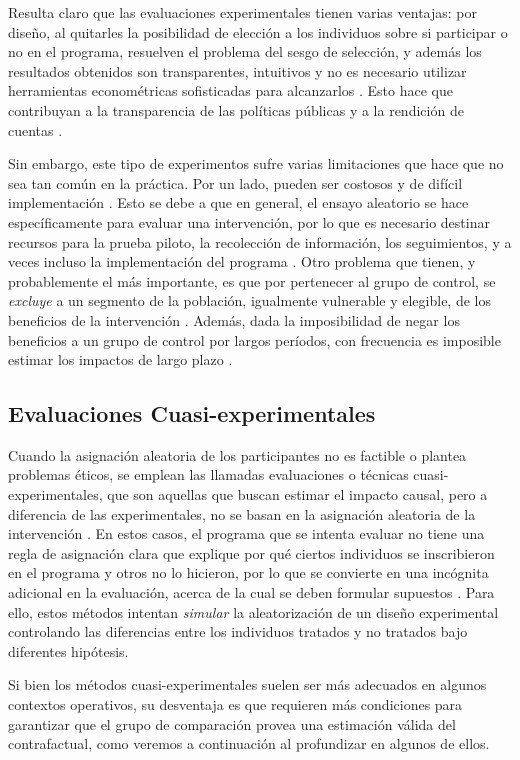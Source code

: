 \documentclass[../../main.tex]{subfiles}
\begin{document}
Resulta claro que las evaluaciones experimentales tienen varias ventajas: por diseño, al
quitarles la posibilidad de elección a los individuos sobre si participar o no en el
programa, resuelven el problema del sesgo de selección, y además los resultados obtenidos
son transparentes, intuitivos y no es necesario utilizar herramientas econométricas
sofisticadas para alcanzarlos \cite{bernal}. Esto hace que contribuyan a la transparencia
de las políticas públicas y a la rendición de cuentas \cite{bernal}.

Sin embargo, este tipo de experimentos sufre varias limitaciones que hace que no sea tan
común en la práctica. Por un lado, pueden ser costosos y de difícil implementación
\cite{bernal}. Esto se debe a que en general, el ensayo aleatorio se hace específicamente
para evaluar una intervención, por lo que es necesario destinar recursos para la prueba
piloto, la recolección de información, los seguimientos, y a veces incluso la
implementación del programa \cite{bernal}. Otro problema que tienen, y probablemente el
más importante, es que por pertenecer al grupo de control, se \textit{excluye} a un
segmento de la población, igualmente vulnerable y elegible, de los beneficios de la
intervención \cite{bernal}. Además, dada la imposibilidad de negar los beneficios a un
grupo de control por largos períodos, con frecuencia es imposible estimar los impactos de
largo plazo \cite{bernal}.

\subsection{Evaluaciones Cuasi-experimentales}
Cuando la asignación aleatoria de los participantes no es factible o plantea problemas
éticos, se emplean las llamadas evaluaciones o técnicas cuasi-experimentales, que son
aquellas que buscan estimar el impacto causal, pero a diferencia de las experimentales, no
se basan en la asignación aleatoria de la intervención \cite{gertler-2016}. En estos
casos, el programa que se intenta evaluar no tiene una regla de asignación clara que
explique por qué ciertos individuos se inscribieron en el programa y otros no lo hicieron,
por lo que se convierte en una incógnita adicional en la evaluación, acerca de la cual se
deben formular supuestos \cite{gertler-2016}. Para ello, estos métodos intentan
\textit{simular} la aleatorización de un diseño experimental controlando las diferencias
entre los individuos tratados y no tratados bajo diferentes hipótesis.

Si bien los métodos cuasi-experimentales suelen ser más adecuados en algunos contextos
operativos, su desventaja es que requieren más condiciones para garantizar que el grupo de
comparación provea una estimación válida del contrafactual, como veremos a continuación al
profundizar en algunos de ellos.
\end{document}
